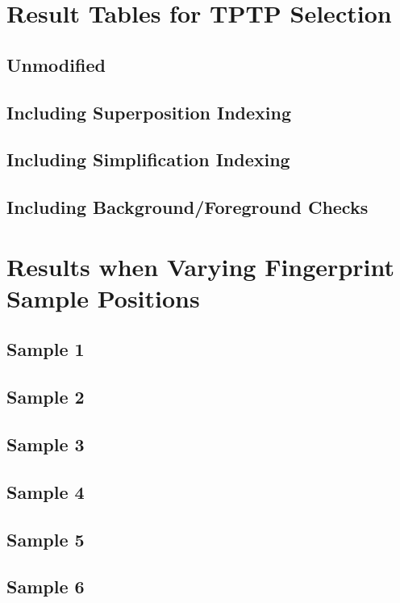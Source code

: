
\appendix

\chapter{Result Tables for TPTP Selection}
\label{app:app1}

\section{Unmodified \Beagle}

\section{Including Superposition Indexing}

\section{Including Simplification Indexing}

\section{Including Background/Foreground Checks}

\chapter{Results when Varying Fingerprint Sample Positions}
\label{app:app2}

\section{Sample 1}

\section{Sample 2}

\section{Sample 3}

\section{Sample 4}

\section{Sample 5}

\section{Sample 6}

